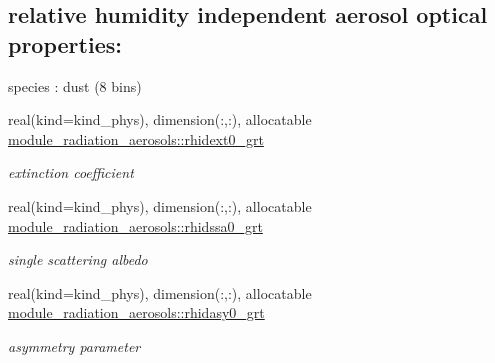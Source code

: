 \subsection*{relative humidity independent aerosol optical properties\+:}
\label{_amgrpa6563448dee168f70e5cf706e8c39b7a}%
species \+: dust (8 bins) \begin{DoxyCompactItemize}
\item 
\mbox{\label{group__module__radiation__aerosols_ga6683021bded82850053c16eb3e906998}} 
real(kind=kind\+\_\+phys), dimension(\+:,\+:), allocatable \hyperlink{group__module__radiation__aerosols_ga6683021bded82850053c16eb3e906998}{module\+\_\+radiation\+\_\+aerosols\+::rhidext0\+\_\+grt}
\begin{DoxyCompactList}\small\item\em extinction coefficient \end{DoxyCompactList}\item 
\mbox{\label{group__module__radiation__aerosols_gaea46db63db26a316e73640bc63f75383}} 
real(kind=kind\+\_\+phys), dimension(\+:,\+:), allocatable \hyperlink{group__module__radiation__aerosols_gaea46db63db26a316e73640bc63f75383}{module\+\_\+radiation\+\_\+aerosols\+::rhidssa0\+\_\+grt}
\begin{DoxyCompactList}\small\item\em single scattering albedo \end{DoxyCompactList}\item 
\mbox{\label{group__module__radiation__aerosols_ga8491a714c86e9bd7ebdc401662f5068e}} 
real(kind=kind\+\_\+phys), dimension(\+:,\+:), allocatable \hyperlink{group__module__radiation__aerosols_ga8491a714c86e9bd7ebdc401662f5068e}{module\+\_\+radiation\+\_\+aerosols\+::rhidasy0\+\_\+grt}
\begin{DoxyCompactList}\small\item\em asymmetry parameter \end{DoxyCompactList}\end{DoxyCompactItemize}
